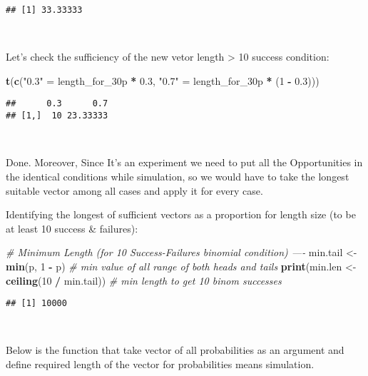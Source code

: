 \documentclass[]{article}
\newenvironment{Shaded}{\begin{snugshade}}{\end{snugshade}}
\newcommand{\CommentTok}[1]{\textcolor[rgb]{0.56,0.35,0.01}{\textit{#1}}}
\newcommand{\DecValTok}[1]{\textcolor[rgb]{0.00,0.00,0.81}{#1}}
\newcommand{\FloatTok}[1]{\textcolor[rgb]{0.00,0.00,0.81}{#1}}
\newcommand{\KeywordTok}[1]{\textcolor[rgb]{0.13,0.29,0.53}{\textbf{#1}}}
\newcommand{\NormalTok}[1]{#1}
\newcommand{\OperatorTok}[1]{\textcolor[rgb]{0.81,0.36,0.00}{\textbf{#1}}}
\newcommand{\StringTok}[1]{\textcolor[rgb]{0.31,0.60,0.02}{#1}}
\begin{document}
\begin{verbatim}
## [1] 33.33333
\end{verbatim}

~

Let's check the sufficiency of the new vetor length \textgreater{} 10
success condition:

\begin{Shaded}
\begin{Highlighting}[]
\KeywordTok{t}\NormalTok{(}\KeywordTok{c}\NormalTok{(}\StringTok{"0.3"}\NormalTok{ =}\StringTok{ }\NormalTok{length_for_30p }\OperatorTok{*}\StringTok{ }\FloatTok{0.3}\NormalTok{, }\StringTok{"0.7"}\NormalTok{ =}\StringTok{ }\NormalTok{length_for_30p }\OperatorTok{*}\StringTok{ }\NormalTok{(}\DecValTok{1} \OperatorTok{-}\StringTok{ }\FloatTok{0.3}\NormalTok{)))}
\end{Highlighting}
\end{Shaded}

\begin{verbatim}
##      0.3      0.7
## [1,]  10 23.33333
\end{verbatim}

~

Done. Moreover, Since It's an experiment we need to put all the
Opportunities in the identical conditions while simulation, so we would
have to take the longest suitable vector among all cases and apply it
for every case.

Identifying the longest of sufficient vectors as a proportion for length
size (to be at least 10 success \& failures):

\begin{Shaded}
\begin{Highlighting}[]
\CommentTok{# Minimum Length (for 10 Success-Failures binomial condition) ----}
\NormalTok{min.tail <-}\StringTok{ }\KeywordTok{min}\NormalTok{(p, }\DecValTok{1} \OperatorTok{-}\StringTok{ }\NormalTok{p) }\CommentTok{# min value of all range of both heads and tails}
\KeywordTok{print}\NormalTok{(min.len  <-}\StringTok{ }\KeywordTok{ceiling}\NormalTok{(}\DecValTok{10} \OperatorTok{/}\StringTok{ }\NormalTok{min.tail)) }\CommentTok{# min length to get 10 binom successes}
\end{Highlighting}
\end{Shaded}

\begin{verbatim}
## [1] 10000
\end{verbatim}

~

Below is the function that take vector of all probabilities as an
argument and define required length of the vector for probabilities
means simulation.
\end{document}
